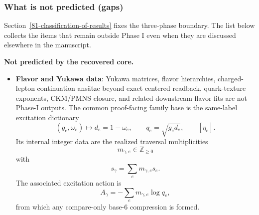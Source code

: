 \subsubsection{What is not predicted (gaps)}\label{84-what-is-not-predicted-gaps}

Section~\ref{81-classification-of-results} fixes the three-phase boundary. The list below collects the items that remain outside Phase I even when they are discussed elsewhere in the manuscript.

\textbf{Not predicted by the recovered core.}
\begin{itemize}
\item \textbf{Flavor and Yukawa data}: Yukawa matrices, flavor hierarchies, charged-lepton continuation ans\"atze beyond exact centered readback, quark-texture exponents, CKM/PMNS closure, and related downstream flavor fits are not Phase-I outputs. The common proof-facing family base is the same-label excitation dictionary
\[
(g_e,\omega_e)\longmapsto d_e=1-\omega_e,\qquad q_e=\sqrt{g_e d_e},\qquad [\eta_e].
\]
Its internal integer data are the realized traversal multiplicities
\[
m_{\gamma,e}\in\mathbb Z_{\ge0}
\]
with
\[
s_\gamma=\sum_e m_{\gamma,e}s_e.
\]
The associated excitation action is
\[
A_\gamma=-\sum_e m_{\gamma,e}\log q_e,
\]
from which any compare-only base-6 compression is formed.

\end{itemize}

